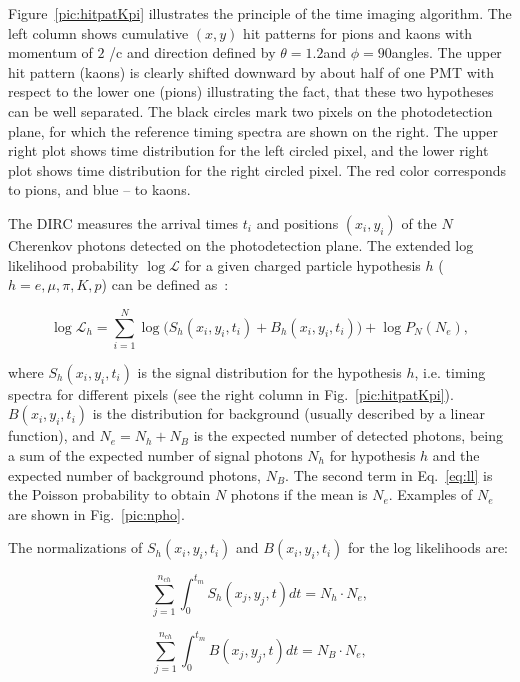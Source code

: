 Figure~\ref{pic:hitpatKpi} illustrates the principle of the time imaging  algorithm. The left column shows cumulative $(x, y)$ hit patterns for pions and kaons with momentum of $2$ {\gev}/c and direction defined by $\theta = 1.2$\mydeg and $\phi = 90$\mydeg angles. The upper hit pattern (kaons) is clearly shifted downward by about half of one PMT with respect to the lower one (pions) illustrating the fact, that these two hypotheses can be well separated. The black circles mark two pixels on the photodetection plane, for which the reference timing spectra are shown on the right. The upper right plot shows time distribution for the left circled pixel, and the lower right plot shows time distribution for the right circled pixel. The red color corresponds to pions, and blue -- to kaons.
 
The DIRC measures the arrival times $t_{i}$ and positions $(x_{i}, y_{i})$ of the $N$ Cherenkov photons detected on the photodetection plane. The extended log likelihood probability $\log\mathcal{L}$ for a given charged particle hypothesis $h$ ($h = e, \mu, \pi, K, p$) can be 
defined as~\cite{staric2}:

\begin{equation}
\log\mathcal{L}_{h} = \sum_{i=1}^{N} \log \Big( S_{h}(x_{i}, y_{i}, t_{i}) + B_{h}(x_{i}, y_{i}, t_{i}) \Big) + \log P_{N}(N_{e}),
\label{eq:ll}
\end{equation}

\noindent where $S_{h} (x_{i}, y_{i}, t_{i})$ is the signal distribution for the hypothesis $h$, i.e. timing spectra for different pixels (see the right column in Fig.~\ref{pic:hitpatKpi}). $B(x_{i}, y_{i}, t_{i})$ is the distribution for background (usually described by a linear function), and $N_{e} = N_{h} + N_{B}$ is the expected number of detected photons, being a sum of the expected number of signal photons $N_{h}$ for hypothesis $h$ and the expected number of background photons, $N_{B}$. The second term in Eq.~\ref{eq:ll} is the Poisson probability to obtain $N$ photons if the mean is $N_{e}$.
Examples of $N_{e}$ are shown in Fig.~\ref{pic:npho}.

The normalizations of $S_{h} (x_{i}, y_{i}, t_{i})$ and $B(x_{i}, y_{i}, t_{i})$ for the log likelihoods are:

\begin{equation}
\sum_{j=1}^{n_{ch}} \int_{0}^{t_{m}} S_{h}(x_{j}, y_{j}, t) dt = N_{h}\cdot N_{e},
\label{eq:norm1}
\end{equation}

\begin{equation}
\sum_{j=1}^{n_{ch}} \int_{0}^{t_{m}} B(x_{j}, y_{j}, t) dt = N_{B} \cdot N_{e},
\label{eq:norm2}
\end{equation}

